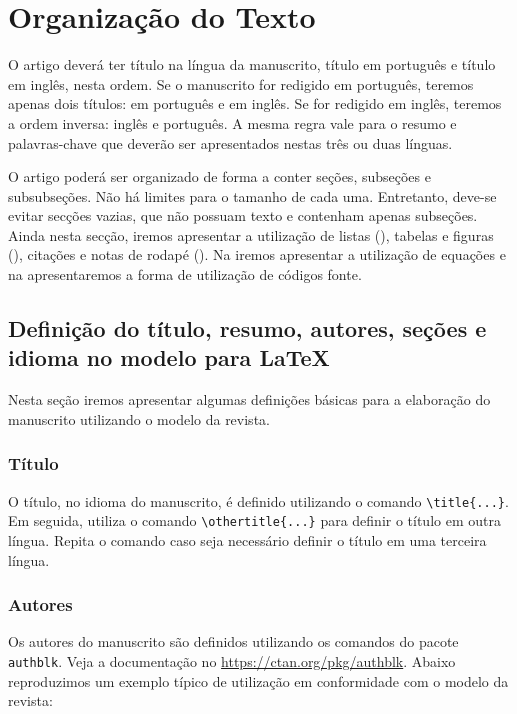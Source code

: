 \documentclass{textolivre}
\begin{document}
\section{Organização do Texto}\label{sec-organizacao}
O artigo deverá ter título na língua da manuscrito, título em português e título em inglês, nesta ordem.
Se o manuscrito for redigido em português, teremos apenas dois títulos: em português e em inglês.
Se for redigido em inglês, teremos a ordem inversa: inglês e português.
A mesma regra vale para o resumo e palavras-chave que deverão ser apresentados nestas três ou duas línguas.

O artigo poderá ser organizado de forma a conter seções, subseções e subsubseções. 
Não há limites para o tamanho de cada uma. Entretanto, deve-se evitar secções vazias, que não possuam texto e contenham apenas subseções. 
Ainda nesta secção, iremos apresentar a utilização de listas (), 
tabelas e figuras (), citações e notas de rodapé (). 
Na  iremos apresentar a utilização de equações e na 
apresentaremos a forma de utilização de códigos fonte.

\lipsum[5]

\subsection{Definição do título, resumo, autores, seções e idioma no modelo para \LaTeX{}}\label{sec-organizacao-latex}
Nesta seção iremos apresentar algumas definições básicas para a elaboração do manuscrito utilizando 
o modelo da revista.

\subsubsection{Título}\label{sec-titulo}
O título, no idioma do manuscrito, é definido utilizando o comando \verb|\title{...}|. Em seguida, 
utiliza o comando \verb|\othertitle{...}| para definir o título em outra língua. Repita o comando
caso seja necessário definir o título em uma terceira língua.

\subsubsection{Autores}\label{sec-autores}
Os autores do manuscrito são definidos utilizando os comandos do pacote \verb|authblk|.
Veja a documentação no \href{CTAN}{https://ctan.org/pkg/authblk}. Abaixo reproduzimos um exemplo típico de utilização 
em conformidade com o modelo da revista:
 
\end{document}
